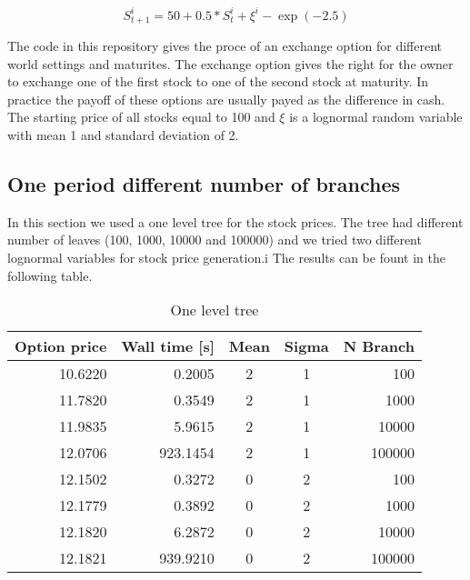 \documentclass[11pt]{article}
\begin{document}
\begin{equation}
\label{eq:price}
S_{t+1}^i = 50 + 0.5 * S_{t}^i + \xi^i - \exp(-2.5)
\end{equation}

The code in this repository gives the proce of an exchange option for different world settings and maturites. The exchange option gives the right for the owner to exchange one of the first stock to one of the second stock at maturity. In practice the payoff of these options are usually payed as the difference in cash. The starting price of all stocks equal to 100 and \(\xi\) is a lognormal random variable with mean 1 and standard deviation of 2.

\subsection{One period different number of branches}
In this section we used a one level tree for the stock prices. The tree had different number of leaves (100, 1000, 10000 and 100000) and we tried two different lognormal variables for stock price generation.i The results can be fount in the following table. 

\begin{table}[h!]
  \begin{center}
    \begin{tabular}{rrccr}
      \textbf{Option price} & \textbf{Wall time [s]} & \textbf{Mean} & \textbf{Sigma} & \textbf{N Branch} \\
      \hline
      10.6220   & 0.2005           &    2 &     1 & 100 \\
      11.7820   & 0.3549           &    2 &     1 & 1000\\
      11.9835   & 5.9615           &    2 &     1 & 10000 \\
      12.0706   & 923.1454         &    2 &     1 & 100000 \\
      \hline
      12.1502   & 0.3272           &    0 &     2 & 100 \\
      12.1779   & 0.3892           &    0 &     2 & 1000 \\
      12.1820   & 6.2872           &    0 &     2 & 10000 \\
      12.1821   & 939.9210         &    0 &     2 & 100000 \\
     \end{tabular}
    \caption{One level tree}
  \end{center}
\end{table}
\end{document}
